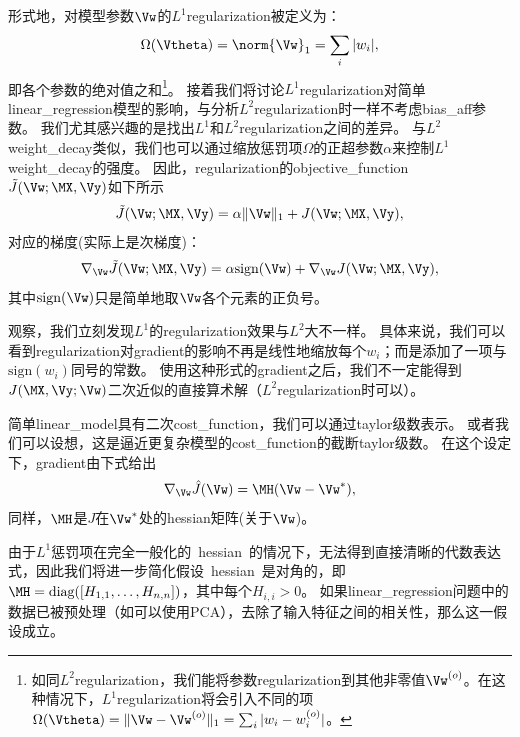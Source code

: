 形式地，对模型参数$\Vw$的$L^1$\gls{regularization}被定义为：
\begin{align}
 \Omega(\Vtheta) = \norm{ \Vw }_1 = \sum_i | w_i |,
 \end{align}
即各个参数的绝对值之和\footnote{如同$L^2$\gls{regularization}，我们能将参数\gls{regularization}到其他非零值$\Vw^{(o)}$。在这种情况下，$L^1$\gls{regularization}将会引入不同的项$\Omega(\Vtheta)=
\|\Vw - \Vw^{(o)} \|_1 = \sum_i | w_i - w_i^{(o)} |$。}。
接着我们将讨论$L^1$\gls{regularization}对简单\gls{linear_regression}模型的影响，与分析$L^2$\gls{regularization}时一样不考虑\gls{bias_aff}参数。  
我们尤其感兴趣的是找出$L^1$和$L^2$\gls{regularization}之间的差异。
与$L^2$\gls{weight_decay}类似，我们也可以通过缩放惩罚项$\Omega$的正超参数$\alpha$来控制$L^1$\gls{weight_decay}的强度。 
因此，\gls{regularization}的\gls{objective_function} $\tilde{J}(\Vw;\MX, \Vy)$如下所示
\begin{align}
\tilde{J}(\Vw;\MX, \Vy) = \alpha \| \Vw \|_1 +  J(\Vw;\MX, \Vy) ,
\end{align}
对应的梯度(实际上是次梯度)：
\begin{align}
\label{eq:subgradient}
  \nabla_{\Vw} \tilde{J}(\Vw; \MX, \Vy) = \alpha \text{sign}(\Vw) + \nabla_{\Vw} J(\Vw; \MX, \Vy), %
\end{align}
其中$\text{sign}(\Vw)$只是简单地取$\Vw$各个元素的正负号。


观察，我们立刻发现$L^1$的\gls{regularization}效果与$L^2$大不一样。
具体来说，我们可以看到\gls{regularization}对\gls{gradient}的影响不再是线性地缩放每个$w_i$；而是添加了一项与$\text{sign}(w_i)$同号的常数。
使用这种形式的\gls{gradient}之后，我们不一定能得到$J(\MX, \Vy;\Vw)$二次近似的直接算术解（$L^2$\gls{regularization}时可以）。 
 
简单\gls{linear_model}具有二次\gls{cost_function}，我们可以通过\gls{taylor}级数表示。
或者我们可以设想，这是逼近更复杂模型的\gls{cost_function}的截断\gls{taylor}级数。
在这个设定下，\gls{gradient}由下式给出
\begin{align}
  \nabla_{\Vw} \hat{J}(\Vw) = \MH (\Vw - \Vw^*),
\end{align}
同样，$\MH$是$J$在$\Vw^*$处的\gls{hessian}矩阵(关于$\Vw$)。

由于$L^1$惩罚项在完全一般化的~\gls{hessian}~的情况下，无法得到直接清晰的代数表达式，因此我们将进一步简化假设~\gls{hessian}~是对角的，即$\MH = \text{diag}([H_{1,1},\dots, H_{n,n}])$，其中每个$H_{i,i}>0$。
如果\gls{linear_regression}问题中的数据已被预处理（如可以使用PCA），去除了输入特征之间的相关性，那么这一假设成立。

